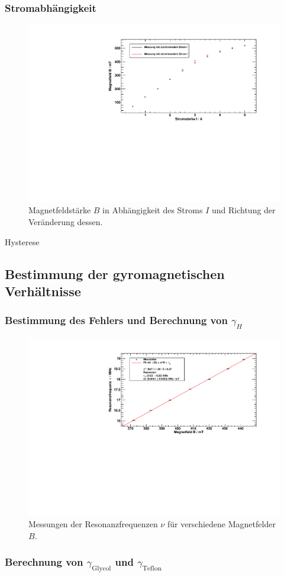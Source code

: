 \subsubsection{Stromabhängigkeit}
\begin{figure}[H]
\begin{center}
  \includegraphics[width=\textwidth]{../img/02-B-I.pdf}
  \caption{Magnetfeldstärke $B$ in Abhängigkeit des Stroms $I$ und Richtung der Veränderung dessen.}
  \label{img:B:I}
\end{center}
\end{figure}
Hysterese

\subsection{Bestimmung der gyromagnetischen Verhältnisse}
\subsubsection{Bestimmung des Fehlers und Berechnung von $\gamma_H$}  %
\begin{figure}[H]
\begin{center}
  \includegraphics[width=\textwidth]{../img/03-H.pdf}
  \caption{Messungen der Resonanzfrequenzen $\nu$ für verschiedene Magnetfelder $B$.}
  \label{img:H}
\end{center}
\end{figure}

\subsubsection{Berechnung von $\gamma_\text{Glycol}$ und $\gamma_\text{Teflon}$}